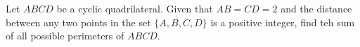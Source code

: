 Let $ABCD$ be a cyclic quadrilateral. Given that $AB=CD=2$ and the distance between any two points in the set $\{A,B,C,D\}$ is a positive integer, find teh sum of all possible perimeters of $ABCD$.
